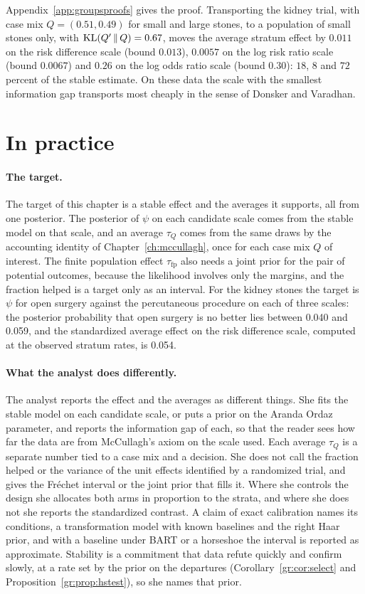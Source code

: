 Appendix~\ref{app:groupsproofs} gives the proof. Transporting the kidney trial, with case mix $Q=(0.51,0.49)$ for small and large stones, to a population of small stones only, with $\mathrm{KL}(Q'\,\|\,Q)=0.67$, moves the average stratum effect by $0.011$ on the risk difference scale (bound $0.013$), $0.0057$ on the log risk ratio scale (bound $0.0067$) and $0.26$ on the log odds ratio scale (bound $0.30$): $18$, $8$ and $72$ percent of the stable estimate. On these data the scale with the smallest information gap transports most cheaply in the sense of Donsker and Varadhan.

\section{In practice}\label{gr:sec:practice}

\paragraph{The target.} The target of this chapter is a stable effect and the averages it supports, all from one posterior. The posterior of $\psi$ on each candidate scale comes from the stable model on that scale, and an average $\tau_Q$ comes from the same draws by the accounting identity of Chapter~\ref{ch:mccullagh}, once for each case mix $Q$ of interest. The finite population effect $\tau_{\mathrm{fp}}$ also needs a joint prior for the pair of potential outcomes, because the likelihood involves only the margins, and the fraction helped is a target only as an interval. For the kidney stones the target is $\psi$ for open surgery against the percutaneous procedure on each of three scales: the posterior probability that open surgery is no better lies between 0.040 and 0.059, and the standardized average effect on the risk difference scale, computed at the observed stratum rates, is 0.054.

\paragraph{What the analyst does differently.} The analyst reports the effect and the averages as different things. She fits the stable model on each candidate scale, or puts a prior on the Aranda Ordaz parameter, and reports the information gap of each, so that the reader sees how far the data are from McCullagh's axiom on the scale used. Each average $\tau_Q$ is a separate number tied to a case mix and a decision. She does not call the fraction helped or the variance of the unit effects identified by a randomized trial, and gives the Fr\'echet interval or the joint prior that fills it. Where she controls the design she allocates both arms in proportion to the strata, and where she does not she reports the standardized contrast. A claim of exact calibration names its conditions, a transformation model with known baselines and the right Haar prior, and with a baseline under BART or a horseshoe the interval is reported as approximate. Stability is a commitment that data refute quickly and confirm slowly, at a rate set by the prior on the departures (Corollary~\ref{gr:cor:select} and Proposition~\ref{gr:prop:hstest}), so she names that prior.

